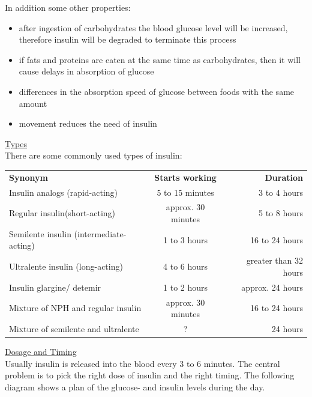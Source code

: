In addition some other properties:
\begin{itemize}
  \item after ingestion of carbohydrates the blood glucose level will be increased, 
	  therefore insulin will be degraded to terminate this process
  \item if fats and proteins are eaten at the same time as carbohydrates, 
	  then it will cause delays in absorption of glucose
  \item differences in the absorption speed of glucose between foods with the same amount
  \item movement reduces the need of insulin
\end{itemize}
\newpage
\underline{Types}\\
There are some commonly used types of insulin:\\
\begin{tabular}{lcr}
	\textbf{Synonym} & \textbf{Starts working} & \textbf{Duration}\\
	Insulin analogs (rapid-acting) & 5 to 15 minutes & 3 to 4 hours\\
	Regular insulin(short-acting) & approx. 30 minutes & 5 to 8 hours\\
	Semilente insulin (intermediate-acting) & 1 to 3 hours & 16 to 24 hours\\
	Ultralente insulin (long-acting) & 4 to 6 hours & greater than 32 hours\\
	Insulin glargine/ detemir & 1 to 2 hours & approx. 24 hours\\
	Mixture of NPH and regular insulin & approx. 30 minutes & 16 to 24 hours\\
	Mixture of semilente and ultralente & ? & 24 hours\\
\end{tabular}
\underline{Dosage and Timing}\\
Usually insulin is released into the blood every 3 to 6 minutes. The central problem is to pick the right dose of insulin 
and the right timing. The following diagram shows a plan of the glucose- and insulin levels during the day.\\
